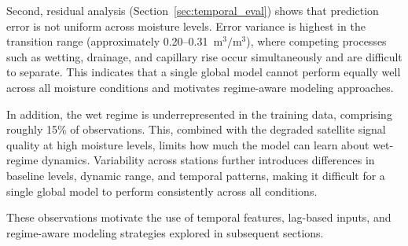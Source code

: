 Second, residual analysis (Section~\ref{sec:temporal_eval}) shows that prediction error is not uniform across moisture levels. Error variance is highest in the transition range (approximately 0.20--0.31~$\mathrm{m^3/m^3}$), where competing processes such as wetting, drainage, and capillary rise occur simultaneously and are difficult to separate. This indicates that a single global model cannot perform equally well across all moisture conditions and motivates regime-aware modeling approaches.

In addition, the wet regime is underrepresented in the training data, comprising roughly 15\% of observations. This, combined with the degraded satellite signal quality at high moisture levels, limits how much the model can learn about wet-regime dynamics. Variability across stations further introduces differences in baseline levels, dynamic range, and temporal patterns, making it difficult for a single global model to perform consistently across all conditions.

These observations motivate the use of temporal features, lag-based inputs, and regime-aware modeling strategies explored in subsequent sections.

